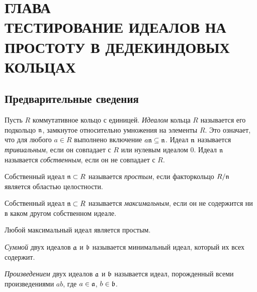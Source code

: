 \documentclass[_00_dissertation.tex]{subfiles}
\begin{document}
\onlyinsubfile{
    \renewcommand{\contentsname}{ОГЛАВЛЕНИЕ}
    \setcounter{tocdepth}{3}
    \tableofcontents
}

\chapter*{\MakeUppercase{Глава \\ Тестирование идеалов на простоту в дедекиндовых кольцах}}\label{chapter:Primality}

\section{Предварительные сведения}


\begin{definition}
    Пусть $R$ коммутативное кольцо с единицей.
    \emph{Идеалом} кольца $R$ называется его подкольцо $\mathfrak{n}$, замкнутое относительно умножения на элементы $R$.
    Это означает, что для любого $a \in R$ выполнено включение $a\mathfrak{n} \subseteq \mathfrak{n}$.
    Идеал $\mathfrak{n}$ называется \emph{тривиальным}, если он совпадает с $R$ или нулевым идеалом $0$.
    Идеал $\mathfrak{n}$ называется \emph{собственным}, если он не совпадает с $R$.
\end{definition}

\begin{definition}
    Собственный идеал $\mathfrak{n} \subset R$ называется \emph{простым}, если факторкольцо $R/\mathfrak{n}$ является областью целостности.
\end{definition}

\begin{definition}
    Собственный идеал $\mathfrak{n} \subset R$ называется \emph{максимальным}, если он не содержится ни в каком другом собственном идеале.
\end{definition}

\begin{remark}
    Любой максимальный идеал является простым.
\end{remark}

\begin{definition}
    \emph{Суммой} двух идеалов $\mathfrak{a}$ и $\mathfrak{b}$ называется минимальный идеал, который их всех содержит.

    \emph{Произведением} двух идеалов $\mathfrak{a}$ и $\mathfrak{b}$ называется идеал, порожденный всеми произведениями $ab$, где $a \in \mathfrak{a}$, $b \in \mathfrak{b}$.
\end{definition}
\end{document}

